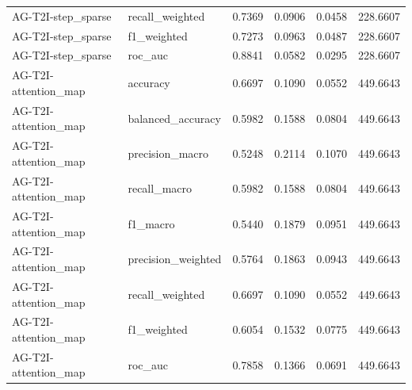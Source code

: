 \begin{tabular}{llrrrr}
AG-T2I-step_sparse & recall_weighted & 0.7369 & 0.0906 & 0.0458 & 228.6607 \\
AG-T2I-step_sparse & f1_weighted & 0.7273 & 0.0963 & 0.0487 & 228.6607 \\
AG-T2I-step_sparse & roc_auc & 0.8841 & 0.0582 & 0.0295 & 228.6607 \\
AG-T2I-attention_map & accuracy & 0.6697 & 0.1090 & 0.0552 & 449.6643 \\
AG-T2I-attention_map & balanced_accuracy & 0.5982 & 0.1588 & 0.0804 & 449.6643 \\
AG-T2I-attention_map & precision_macro & 0.5248 & 0.2114 & 0.1070 & 449.6643 \\
AG-T2I-attention_map & recall_macro & 0.5982 & 0.1588 & 0.0804 & 449.6643 \\
AG-T2I-attention_map & f1_macro & 0.5440 & 0.1879 & 0.0951 & 449.6643 \\
AG-T2I-attention_map & precision_weighted & 0.5764 & 0.1863 & 0.0943 & 449.6643 \\
AG-T2I-attention_map & recall_weighted & 0.6697 & 0.1090 & 0.0552 & 449.6643 \\
AG-T2I-attention_map & f1_weighted & 0.6054 & 0.1532 & 0.0775 & 449.6643 \\
AG-T2I-attention_map & roc_auc & 0.7858 & 0.1366 & 0.0691 & 449.6643 \\
\bottomrule
\end{tabular}
